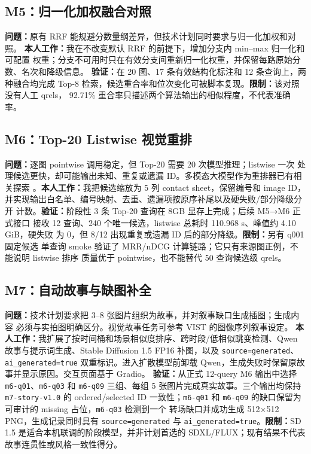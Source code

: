 \documentclass[UTF8,11pt,a4paper]{ctexart}
\begin{document}
\subsection{M5：归一化加权融合对照}

\textbf{问题：}原有 RRF 能规避分数量纲差异，但技术计划同时要求与归一化加权和对照。
\textbf{本人工作：}我在不改变默认 RRF 的前提下，增加分支内 min--max 归一化和可配置
权重；分支不可用时只在有效分支间重新归一化权重，并保留每路原始分数、名次和降级信息。
\textbf{验证：}在 20 图、17 条有效结构化标注和 12 条查询上，两种融合均完成 Top-8
检索，候选重合率和位次变化可被脚本复现。\textbf{限制：}该对照没有人工 qrels，
92.71\% 重合率只描述两个算法输出的相似程度，不代表准确率。

\subsection{M6：Top-20 Listwise 视觉重排}

\textbf{问题：}逐图 pointwise 调用稳定，但 Top-20 需要 20 次模型推理；listwise 一次
处理候选更快，却可能输出未知、重复或遗漏 ID。多模态大模型作为重排器已有相关探索
\citep{ragvl}。\textbf{本人工作：}我把候选缩放为 5 列 contact sheet，保留编号和
image ID，并实现输出白名单、编号映射、去重、遗漏项按原序补尾以及硬失败/部分降级分开
计数。\textbf{验证：}阶段性 3 条 Top-20 查询在 8GB 显存上完成；后续 M5→M6 正式接口
接收 12 查询、240 个唯一候选，listwise 总耗时 110.968 s、峰值约 4.10 GiB，硬失败
为 0，但 8/12 出现重复或遗漏 ID 后的部分降级。\textbf{限制：}另有 q001 固定候选
单查询 smoke 验证了 MRR/nDCG 计算链路；它只有来源图正例，不能说明 listwise 排序
质量优于 pointwise，也不能替代 50 查询候选级 qrels。

\subsection{M7：自动故事与缺图补全}

\textbf{问题：}技术计划要求把 3--8 张图片组织为故事，并对叙事缺口生成插图；生成内容
必须与实拍图明确区分。视觉故事任务可参考 VIST 的图像序列叙事设定\citep{vist2016}。
\textbf{本人工作：}我扩展了按时间桶和场景相似度排序、跨时段/低相似跳变检测、Qwen
故事与提示词生成、Stable Diffusion 1.5 FP16 补图，以及
\texttt{source=generated}、\texttt{ai\_generated=true} 双重标识。进入扩散模型前卸载
Qwen，生成失败时保留原故事并显示原因。交互页面基于 Gradio\citep{gradio}。
\textbf{验证：}从正式 12-query M6 输出中选择 \texttt{m6-q01}、\texttt{m6-q03} 和
\texttt{m6-q09} 三组、每组 5 张图片完成真实故事。三个输出均保持
\texttt{m7-story-v1.0} 的 ordered/selected ID 一致性；\texttt{m6-q01} 和
\texttt{m6-q09} 的缺口保留为可审计的 missing 占位，\texttt{m6-q03} 检测到一个
转场缺口并成功生成 512$\times$512 PNG，生成记录同时具有
\texttt{source=generated} 与 \texttt{ai\_generated=true}。\textbf{限制：}SD 1.5
是适合本机联调的阶段模型，并非计划首选的
SDXL/FLUX；现有结果不代表故事连贯性或风格一致性得分。
\end{document}
